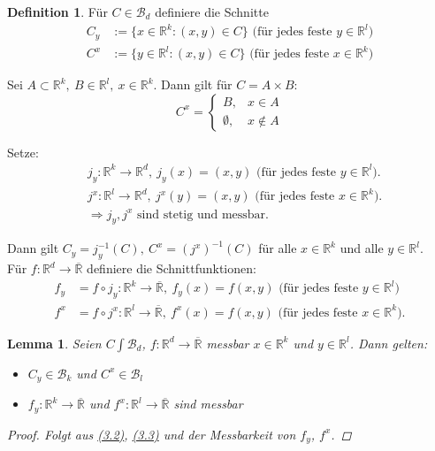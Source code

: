 \documentclass[a4paper]{report}
\newcommand{\R}{\mathbb{R}}
\newcommand{\Rq}{\overline{\R}}
\newcommand{\Borel}{\mathcal{B}}
\newcommand{\Bd}{\Borel_d}
\newcommand{\jlabel}[1]{\label{j_#1}}
\newcommand{\jhyperref}[2]{\hyperref[j_#1]{#2}}
\newcommand{\jlink}[1]{\jhyperref{#1}{#1}}
\newcommand{\jabb}[3]{ #1: #2 \rightarrow #3 }
\theoremstyle{plain}
\newtheorem{lem}[thm]{Lemma}
\theoremstyle{definition}
\newtheorem*{defn*}{Definition}
\begin{document}
{{{{\begin{defn*}
    Für $C\in\Bd$ definiere die Schnitte
    \begin{displaymath}
        \begin{split}
            C_y &:= \{x\in \R^k: (x,y) \in C\} \text{  (für jedes feste $y\in\R^l$)}\\
            C^x &:= \{y\in \R^l: (x,y) \in C\} \text{  (für jedes feste $x\in\R^k$)}
        \end{split}
    \end{displaymath}

    Sei $A\subset \R^k, \ B \in \R^l, \ x \in \R^k$. Dann gilt für $C = A\times B$:
    \jlabel{(3.1)}
    \begin{equation}
        C^x = \begin{cases} B, &x\in A\\ \emptyset, &x\notin A \end{cases}
    \end{equation}

    Setze:
    \jlabel{(3.2)}
    \begin{equation}
        \begin{split}
            &\jabb{j_y}{\R^k}{\R^d}, \ j_y(x) = (x,y) \text{  (für jedes feste $y\in \R^l$).}\\
            &\jabb{j^x}{\R^l}{\R^d}, \ j^x(y) = (x,y) \text{  (für jedes feste $x\in \R^k$).}\\
            &\Rightarrow j_y, j^x \text{ sind stetig und messbar.}
        \end{split}
    \end{equation}

    Dann gilt $C_y = j_y^{-1}(C), \ C^x = (j^x)^{-1}(C)$ für alle $x\in \R^k$ und alle $y\in \R^l$.\\
    Für $\jabb{f}{\R^d}{\Rq}$ definiere die Schnittfunktionen:
    \jlabel{(3.3)}
    \begin{equation}
        \begin{split}
            f_y &= \jabb{f\circ j_y}{\R^k}{\Rq}, \ f_y(x) = f(x,y) \text{  (für jedes feste $y\in \R^l$)}\\
            f^x &= \jabb{f\circ j^x}{\R^l}{\Rq}, \ f^x(x) = f(x,y) \text{  (für jedes feste $x\in \R^k$)}.
        \end{split}
    \end{equation}
\end{defn*}

\begin{lem}
\jlabel{Lem 3.18}
    Seien $C\int \Bd$, $ \jabb{f}{\R^d}{\Rq}$ messbar $x\in \R^k$ und $y\in \R^l$. Dann gelten:
    \begin{itemize}
        \item $C_y\in \Borel_k$ und $C^x \in \Borel_l$
        \item $\jabb{f_y}{\R^k}{\Rq}$ und $\jabb{f^x}{\R^l}{\Rq}$ sind messbar
    \end{itemize}
    \begin{proof}
        Folgt aus \jlink{(3.2)}, \jlink{(3.3)} und der Messbarkeit von $f_y$, $f^x$.
    \end{proof}
\end{lem}

}}}}
\end{document}
